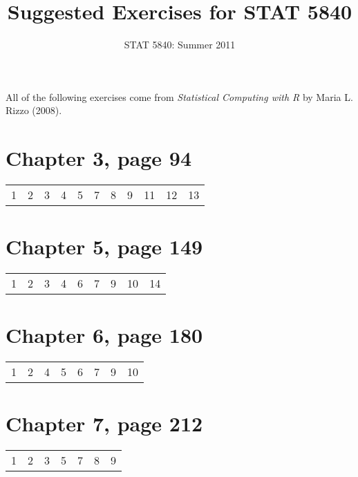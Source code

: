 \documentclass[10pt,english]{article}
\title{Suggested Exercises for STAT 5840}
\date{STAT 5840: Summer 2011}
\begin{document}
\maketitle

\thispagestyle{empty}

All of the following exercises come from \emph{Statistical Computing with R} by Maria L. Rizzo (2008).

\section*{Chapter 3, page 94}
\label{sec-1}


\begin{center}
\begin{tabular}{rrrrrrrrrrr}
 1  &  2  &  3  &  4  &  5  &  7  &  8  &  9  &  11  &  12  &  13  \\
\end{tabular}
\end{center}
\section*{Chapter 5, page 149}
\label{sec-2}


\begin{center}
\begin{tabular}{rrrrrrrrr}
 1  &  2  &  3  &  4  &  6  &  7  &  9  &  10  &  14  \\
\end{tabular}
\end{center}
\section*{Chapter 6, page 180}
\label{sec-3}


\begin{center}
\begin{tabular}{rrrrrrrr}
 1  &  2  &  4  &  5  &  6  &  7  &  9  &  10  \\
\end{tabular}
\end{center}
\section*{Chapter 7, page 212}
\label{sec-4}


\begin{center}
\begin{tabular}{rrrrrrr}
 1  &  2  &  3  &  5  &  7  &  8  &  9  \\
\end{tabular}
\end{center}
\end{document}
